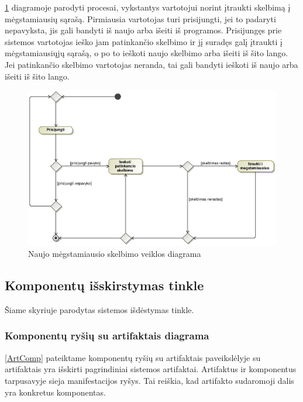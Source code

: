 \documentclass[12pt]{article}
\begin{document}
	\ref{FavActivity} diagramoje parodyti procesai, vykstantys vartotojui norint įtraukti skelbimą į mėgstamiausių sąrašą. Pirmiausia vartotojas turi prisijungti, jei to padaryti nepavyksta, jis gali bandyti iš naujo arba išeiti iš programos. Prisijungęs prie sistemos vartotojas ieško jam patinkančio skelbimo ir jį suradęs galį įtraukti į mėgstamiausiųjų sąrašą, o po to ieškoti naujo skelbimo arba išeiti iš šito lango. Jei patinkančio skelbimo vartotojas neranda, tai gali bandyti ieškoti iš naujo arba išeiti iš šito lango.
	\begin{figure}[h]
		\begin{center}
			\includegraphics[width=\textwidth]{MegstamiausiuVeikla.eps}
			\caption{Naujo mėgstamiausio skelbimo veiklos diagrama\label{FavActivity}}
		\end{center}
	\end{figure}
	
	\pagebreak
	
	\subsection{Komponentų išskirstymas tinkle}
	Šiame skyriuje parodytas sistemos išdėstymas tinkle.
	\subsubsection{Komponentų ryšių su artifaktais diagrama}
	
	\ref{ArtComp} pateiktame komponentų ryšių su artifaktais paveikslėlyje su artifaktais yra išskirti pagrindiniai sistemos artifaktai. Artifaktus ir komponentus tarpusavyje sieja manifestacijos ryšys. Tai reiškia, kad artifakto sudaromoji dalis yra konkretus komponentas.
	
\end{document}
